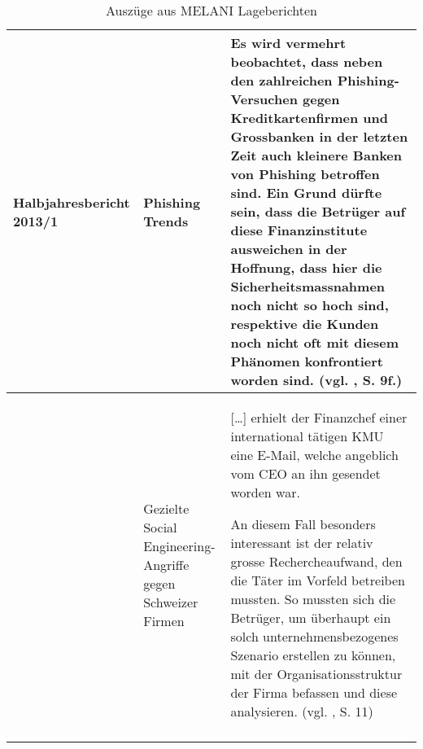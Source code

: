 \documentclass[../../main.tex]{subfiles}
\begin{document}
\begin{sloppypar}
\begin{longtable}[c]{ |p{4.0 cm}|p{4.5cm}|p{8.0cm}|}
\textbf{Halbjahresbericht 2013/1}  & Phishing Trends & Es wird vermehrt beobachtet, dass neben den zahlreichen Phishing-Versuchen gegen Kreditkartenfirmen und Grossbanken in der letzten Zeit auch kleinere Banken von Phishing betroffen sind. Ein Grund dürfte sein, dass die Betrüger auf diese Finanzinstitute ausweichen in der Hoffnung, dass hier die Sicherheitsmassnahmen noch nicht so hoch sind, respektive die Kunden noch nicht oft mit diesem Phänomen konfrontiert worden sind.
\newline
(vgl. \cite{melani_halbjahresbericht_2013}, S. 9f.) \\
\hline

& Gezielte Social Engineering-\newline Angriffe gegen Schweizer Firmen & [\dots] erhielt der Finanzchef einer international tätigen KMU eine E-Mail, welche angeblich vom CEO an ihn gesendet worden war.

An diesem Fall besonders interessant ist der relativ grosse Rechercheaufwand, den die Täter im Vorfeld betreiben mussten. So mussten sich die Betrüger, um überhaupt ein solch unternehmensbezogenes Szenario erstellen zu können, mit der Organisationsstruktur der Firma befassen und diese analysieren.
\newline
(vgl. \cite{melani_halbjahresbericht_2013}, S. 11)\\
\hline


\caption{Auszüge aus MELANI Lageberichten\label{long}}\\
\end{longtable}
 
\end{sloppypar}
\end{document}
